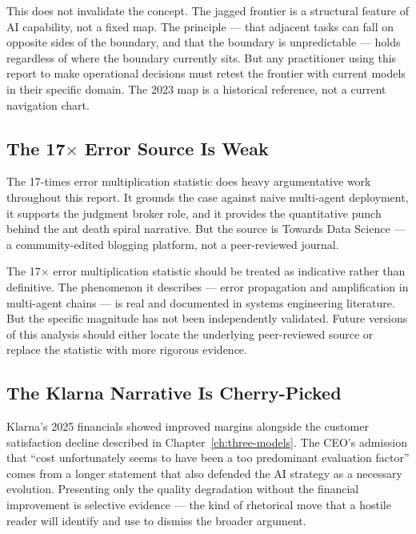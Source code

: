 This does not invalidate the concept. The jagged frontier is a structural feature of AI capability, not a fixed map. The principle --- that adjacent tasks can fall on opposite sides of the boundary, and that the boundary is unpredictable --- holds regardless of where the boundary currently sits. But any practitioner using this report to make operational decisions must retest the frontier with current models in their specific domain. The 2023 map is a historical reference, not a current navigation chart.

\subsection{The 17$\times$ Error Source Is Weak}

The 17-times error multiplication statistic \parencite{TDS2026} does heavy argumentative work throughout this report. It grounds the case against naive multi-agent deployment, it supports the judgment broker role, and it provides the quantitative punch behind the ant death spiral narrative. But the source is Towards Data Science --- a community-edited blogging platform, not a peer-reviewed journal.

\begin{cautionbox}
The 17$\times$ error multiplication statistic should be treated as indicative rather than definitive. The phenomenon it describes --- error propagation and amplification in multi-agent chains --- is real and documented in systems engineering literature. But the specific magnitude has not been independently validated. Future versions of this analysis should either locate the underlying peer-reviewed source or replace the statistic with more rigorous evidence.
\end{cautionbox}

\subsection{The Klarna Narrative Is Cherry-Picked}

Klarna's 2025 financials showed improved margins alongside the customer satisfaction decline described in Chapter~\ref{ch:three-models}. The CEO's admission that ``cost unfortunately seems to have been a too predominant evaluation factor'' \parencite{Klarna2025} comes from a longer statement that also defended the AI strategy as a necessary evolution. Presenting only the quality degradation without the financial improvement is selective evidence --- the kind of rhetorical move that a hostile reader will identify and use to dismiss the broader argument.

